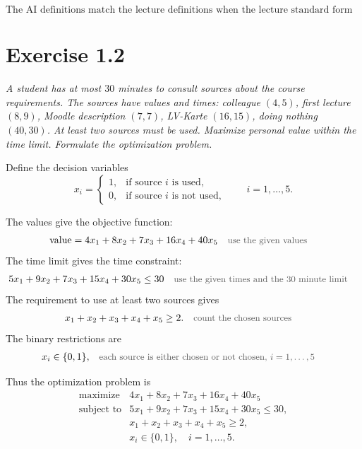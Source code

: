 \documentclass[a4paper,11pt]{article}
\newif\ifexplain
\newcommand{\aufgabe}[1]{\section*{#1}}
\newcommand{\angabe}[1]{\textit{#1}\par\smallskip}
\newcommand{\why}[1]{\text{\small\color{black!65}#1}}
\newcommand{\explain}[1]{\ifexplain\begin{erklbox}#1\end{erklbox}\fi}
\begin{document}
\[
\boxed{\text{The AI definitions match the lecture definitions when the lecture standard form is used.}}
\]

\aufgabe{Exercise 1.2}
\angabe{A student has at most $30$ minutes to consult sources about the course requirements. The sources have values and times: colleague $(4,5)$, first lecture $(8,9)$, Moodle description $(7,7)$, LV-Karte $(16,15)$, doing nothing $(40,30)$. At least two sources must be used. Maximize personal value within the time limit. Formulate the optimization problem.}
\explain{Jede Quelle kann entweder gewählt oder nicht gewählt werden. Deshalb passen binäre Variablen: $1$ bedeutet gewählt, $0$ bedeutet nicht gewählt.}

Define the decision variables
\[
x_i=\begin{cases}
1, & \text{if source }i\text{ is used},\\
0, & \text{if source }i\text{ is not used},
\end{cases}
\qquad i=1,\dots,5.
\]
\explain{Die fünfte Option verbraucht bereits alle 30 Minuten. Zusammen mit der Bedingung ``at least two'' kann sie in keiner zulässigen Lösung gewählt werden. Trotzdem darf sie im Modell stehen; die Nebenbedingungen regeln das.}

The values give the objective function:
\begin{align*}
\text{value} &= 4x_1+8x_2+7x_3+16x_4+40x_5 && \why{use the given values}
\end{align*}
The time limit gives the time constraint:
\begin{align*}
5x_1+9x_2+7x_3+15x_4+30x_5 &\le 30 && \why{use the given times and the $30$ minute limit}
\end{align*}
The requirement to use at least two sources gives
\begin{align*}
x_1+x_2+x_3+x_4+x_5 &\ge 2. && \why{count the chosen sources}
\end{align*}
The binary restrictions are
\begin{align*}
x_i&\in\{0,1\}, && \why{each source is either chosen or not chosen, $i=1,\dots,5$}
\end{align*}
\explain{Die Zielfunktion wird maximiert, weil der persönliche Wert möglichst groß sein soll. Die Zeit steht als Nebenbedingung, weil höchstens 30 Minuten erlaubt sind.}

Thus the optimization problem is
\[
\boxed{
\begin{array}{ll}
\text{maximize} & 4x_1+8x_2+7x_3+16x_4+40x_5\\[2mm]
\text{subject to} & 5x_1+9x_2+7x_3+15x_4+30x_5\le30,\\
& x_1+x_2+x_3+x_4+x_5\ge2,\\
& x_i\in\{0,1\},\quad i=1,\dots,5.
\end{array}}
\]
\end{document}
